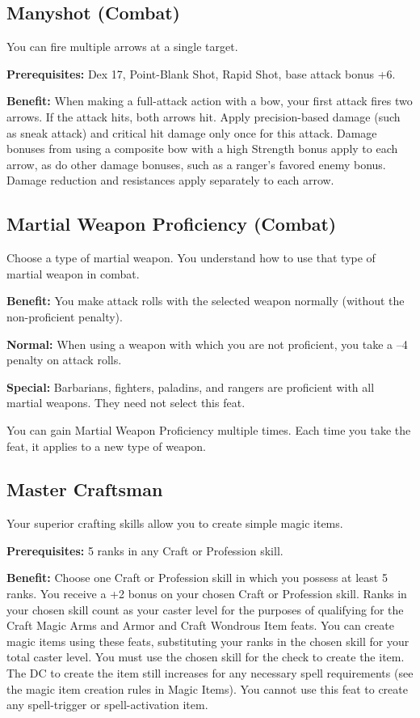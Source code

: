 \subsection{Manyshot (Combat)}

				
You can fire multiple arrows at a single target.
				
\textbf{Prerequisites:} Dex 17, Point-Blank Shot, Rapid Shot, base attack bonus +6.
				
\textbf{Benefit:} When making a full-attack action with a bow, your first attack fires two arrows. If the attack hits, both arrows hit. Apply precision-based damage (such as sneak attack) and critical hit damage only once for this attack. Damage bonuses from using a composite bow with a high Strength bonus apply to each arrow, as do other damage bonuses, such as a ranger's favored enemy bonus. Damage reduction and resistances apply separately to each arrow.
				
\subsection{Martial Weapon Proficiency (Combat)}

				
Choose a type of martial weapon. You understand how to use that type of martial weapon in combat.
				
\textbf{Benefit:} You make attack rolls with the selected weapon normally (without the non-proficient penalty).
				
\textbf{Normal:} When using a weapon with which you are not proficient, you take a --4 penalty on attack rolls.
				
\textbf{Special:} Barbarians, fighters, paladins, and rangers are proficient with all martial weapons. They need not select this feat.

You can gain Martial Weapon Proficiency multiple times. Each time you take the feat, it applies to a new type of weapon. 
				
\subsection{Master Craftsman}

				
Your superior crafting skills allow you to create simple magic items.
				
\textbf{Prerequisites:} 5 ranks in any Craft or Profession skill.
				
\textbf{Benefit:} Choose one Craft or Profession skill in which you possess at least 5 ranks. You receive a +2 bonus on your chosen Craft or Profession skill. Ranks in your chosen skill count as your caster level for the purposes of qualifying for the Craft Magic Arms and Armor and Craft Wondrous Item feats. You can create magic items using these feats, substituting your ranks in the chosen skill for your total caster level. You must use the chosen skill for the check to create the item. The DC to create the item still increases for any necessary spell requirements (see the magic item creation rules in Magic Items). You cannot use this feat to create any spell-trigger or spell-activation item.
				
